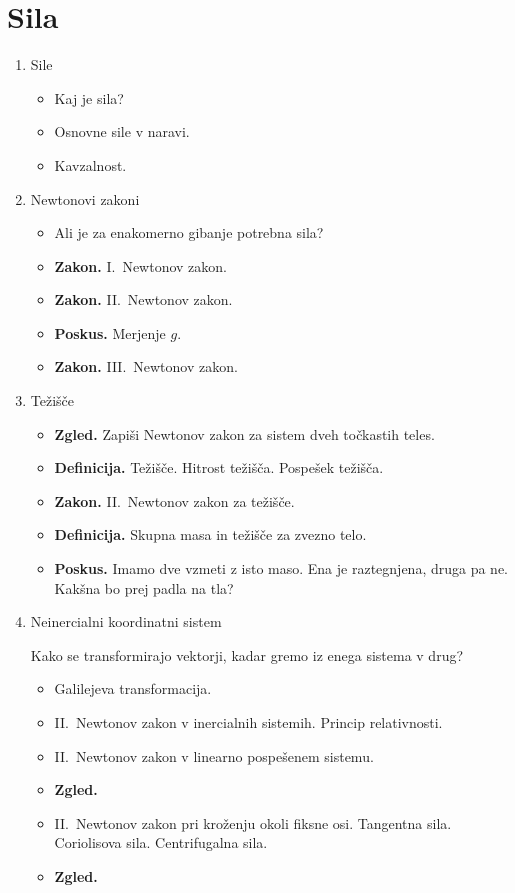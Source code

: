 \section{Sila}
\begin{enumerate}
    \item Sile
    \begin{itemize}
        \item Kaj je sila? 
        \item Osnovne sile v naravi.
        \item Kavzalnost.
    \end{itemize}

    \item Newtonovi zakoni
    \begin{itemize}
        \item Ali je za enakomerno gibanje potrebna sila?
        \item \textbf{Zakon.} I.\ Newtonov zakon.
        \item \textbf{Zakon.} II.\ Newtonov zakon.
        \item \textbf{Poskus.} Merjenje \(g\).
        \item \textbf{Zakon.} III.\ Newtonov zakon.
    \end{itemize}

    \item Težišče
    \begin{itemize}
        \item \textbf{Zgled.} Zapiši Newtonov zakon za sistem dveh točkastih teles.
        \item \textbf{Definicija.} Težišče. Hitrost težišča. Pospešek težišča.
        \item \textbf{Zakon.} II.\ Newtonov zakon za težišče.
        \item \textbf{Definicija.} Skupna masa in težišče za zvezno telo.
        \item \textbf{Poskus.} Imamo dve vzmeti z isto maso. Ena je raztegnjena, druga pa ne. Kakšna bo prej padla na tla?
    \end{itemize}

    \item Neinercialni koordinatni sistem
    
    Kako se transformirajo vektorji, kadar gremo iz enega sistema v drug?
    \begin{itemize}
        \item Galilejeva transformacija.
        \item II.\ Newtonov zakon v inercialnih sistemih. Princip relativnosti.
        \item II.\ Newtonov zakon v linearno pospešenem sistemu.
        \item \textbf{Zgled.} \todo{}
        \item II.\ Newtonov zakon pri kroženju okoli fiksne osi. Tangentna sila. Coriolisova sila. Centrifugalna sila.
        \item \textbf{Zgled.} \todo{}
    \end{itemize}
\end{enumerate}


